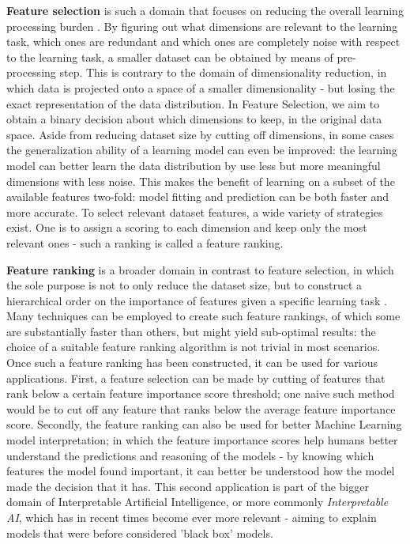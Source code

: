 \documentclass{article}
\begin{document}
\textbf{Feature selection} is such a domain that focuses on reducing the overall learning processing burden \citep{guyon_introduction_2003}. By figuring out what dimensions are relevant to the learning task, which ones are redundant and which ones are completely noise with respect to the learning task, a smaller dataset can be obtained by means of pre-processing step. This is contrary to the domain of dimensionality reduction, in which data is projected onto a space of a smaller dimensionality - but losing the exact representation of the data distribution. In Feature Selection, we aim to obtain a binary decision about which dimensions to keep, in the original data space. Aside from reducing dataset size by cutting off dimensions, in some cases the generalization ability of a learning model can even be improved: the learning model can better learn the data distribution by use less but more meaningful dimensions with less noise. This makes the benefit of learning on a subset of the available features two-fold: model fitting and prediction can be both faster and more accurate. To select relevant dataset features, a wide variety of strategies exist. One is to assign a scoring to each dimension and keep only the most relevant ones - such a ranking is called a feature ranking.

\textbf{Feature ranking} is a broader domain in contrast to feature selection, in which the sole purpose is not to only reduce the dataset size, but to construct a hierarchical order on the importance of features given a specific learning task \citep{duch_comparison_2004}. Many techniques can be employed to create such feature rankings, of which some are substantially faster than others, but might yield sub-optimal results: the choice of a suitable feature ranking algorithm is not trivial in most scenarios. Once such a feature ranking has been constructed, it can be used for various applications. First, a feature selection can be made by cutting of features that rank below a certain feature importance score threshold; one naive such method would be to cut off any feature that ranks below the average feature importance score. Secondly, the feature ranking can also be used for better Machine Learning model interpretation; in which the feature importance scores help humans better understand the predictions and reasoning of the models - by knowing which features the model found important, it can better be understood how the model made the decision that it has. This second application is part of the bigger domain of Interpretable Artificial Intelligence, or more commonly \textit{Interpretable AI}, which has in recent times become ever more relevant \citep{ghosh_interpretable_2020} - aiming to explain models that were before considered 'black box' models.
\end{document}

